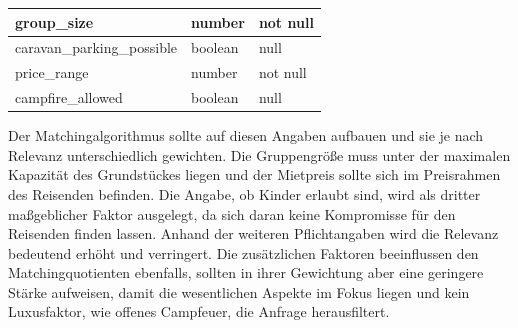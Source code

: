 \begin{table}[H]
\begin{tabular}{|l|l|l|}
group\_size                                                          & number                                 & not null                                  \\ \hline
caravan\_parking\_possible  										 & boolean                                & null                                      \\ \hline
price\_range                                                         & number                                 & not null                                  \\ \hline
campfire\_allowed                                                    & boolean                                & null                                      \\ \hline
\end{tabular}
\label{tab:ausstattungsattribute}
\end{table}

Der Matchingalgorithmus sollte auf diesen Angaben aufbauen und sie je nach Relevanz unterschiedlich gewichten.
Die Gruppengröße muss unter der maximalen Kapazität des Grundstückes liegen und der Mietpreis sollte sich im Preisrahmen des Reisenden befinden. 
Die Angabe, ob Kinder erlaubt sind, wird als dritter maßgeblicher Faktor ausgelegt, da sich daran keine Kompromisse für den Reisenden finden lassen.
Anhand der weiteren Pflichtangaben wird die Relevanz bedeutend erhöht und verringert. Die zusätzlichen Faktoren beeinflussen den Matchingquotienten ebenfalls, sollten in ihrer Gewichtung aber eine geringere Stärke aufweisen, damit die wesentlichen Aspekte im Fokus liegen und kein Luxusfaktor, wie offenes Campfeuer, die Anfrage herausfiltert.
